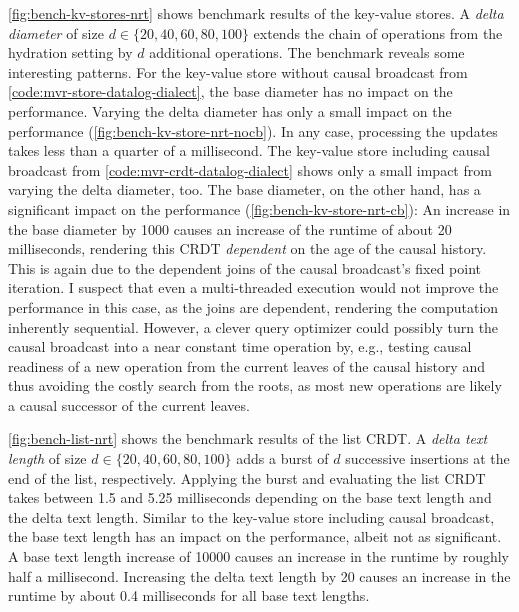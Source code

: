 

\ref{fig:bench-kv-stores-nrt} shows benchmark results of the key-value stores.
A \emph{delta diameter} of size \(d \in \{20, 40, 60, 80, 100\}\) extends the
chain of operations from the hydration setting by \(d\) additional operations.
The benchmark reveals some interesting patterns.
For the key-value store without causal broadcast
from \ref{code:mvr-store-datalog-dialect},
the base diameter has no impact on the performance.
Varying the delta diameter has only a small impact on the
performance (\ref{fig:bench-kv-store-nrt-nocb}).
In any case, processing the updates takes less than a quarter of a millisecond.
The key-value store including causal broadcast
from \ref{code:mvr-crdt-datalog-dialect} shows only a small impact from
varying the delta diameter, too.
The base diameter, on the other hand, has a significant impact on the performance
(\ref{fig:bench-kv-store-nrt-cb}):
An increase in the base diameter by 1000 causes an increase of the runtime of
about 20 milliseconds, rendering this \ac{CRDT} \emph{dependent} on the age
of the causal history.
This is again due to the dependent joins of the causal broadcast's fixed point
iteration.
I suspect that even a multi-threaded execution would not improve the performance
in this case, as the joins are dependent, rendering the computation inherently
sequential.
However, a clever query optimizer could possibly turn the causal broadcast into
a near constant time operation by, e.g., testing causal readiness of a new operation
from the current leaves of the causal history and thus avoiding the
costly search from the roots, as most new operations are likely a causal successor
of the current leaves.



\ref{fig:bench-list-nrt} shows the benchmark results of the list \ac{CRDT}.
A \emph{delta text length} of size \(d \in \{20, 40, 60, 80, 100\}\) adds
a burst of \(d\) successive insertions at the end of the list, respectively.
Applying the burst and evaluating the list \ac{CRDT} takes between 1.5 and
5.25 milliseconds depending on the base text length and the delta text length.
Similar to the key-value store including causal broadcast,
the base text length has an impact on the performance, albeit not as significant.
A base text length increase of 10000 causes an increase in the runtime by roughly
half a millisecond.
Increasing the delta text length by 20 causes an increase in the runtime
by about 0.4 milliseconds for all base text lengths.

